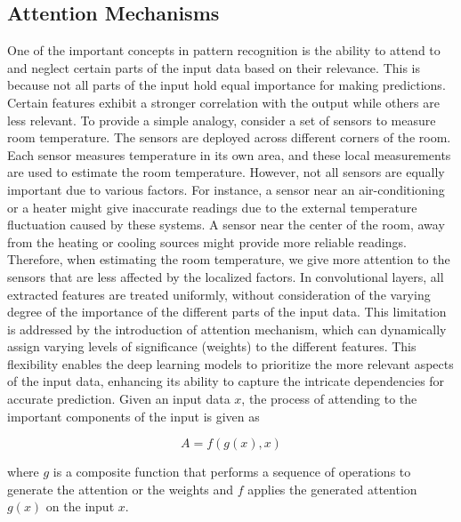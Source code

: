 \documentclass[preprint,12pt]{elsarticle}
\begin{document}
\subsection{Attention Mechanisms}
One of the important concepts in pattern recognition is the ability to attend to and neglect certain parts of the input data based on their relevance. This is because not all parts of the input hold equal importance for making predictions. Certain features exhibit a stronger correlation with the output while others are less relevant. To provide a simple analogy, consider a set of sensors to measure room temperature. The sensors are deployed across different corners of the room. Each sensor measures temperature in its own area, and these local measurements are used to estimate the room temperature. However, not all sensors are equally important due to various factors. For instance, a sensor near an air-conditioning or a heater might give inaccurate readings due to the external temperature fluctuation caused by these systems. A sensor near the center of the room, away from the heating or cooling sources might provide more reliable readings. Therefore, when estimating the room temperature, we give more attention to the sensors that are less affected by the localized factors. In convolutional layers, all extracted features are treated uniformly, without consideration of the varying degree of the importance of the different parts of the input data. This limitation is addressed by the introduction of attention mechanism, which can dynamically assign varying levels of significance (weights) to the different features. This flexibility enables the deep learning models to prioritize the more relevant aspects of the input data, enhancing its ability to capture the intricate dependencies for accurate prediction. Given an input data $x$, the process of attending to the important components of the input is given as

\begin{equation}
A=f(g(x),x)
\end{equation}

\noindent where $g$ is a composite function that performs a sequence of operations to generate the attention or the weights and $f$ applies the generated attention $g(x)$ on the input $x$. 
\end{document}
